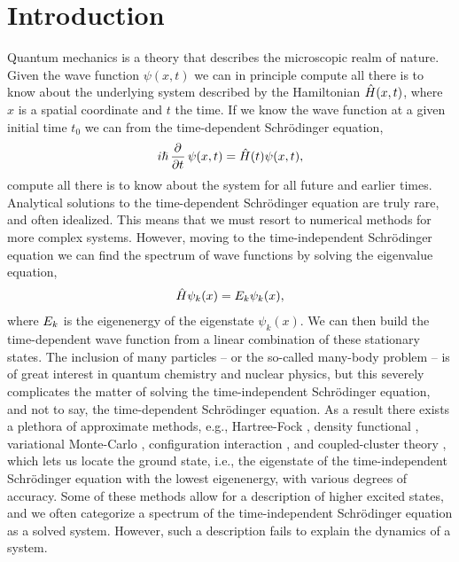 \chapter{Introduction}
    Quantum mechanics is a theory that describes the microscopic realm of
    nature.
    Given the wave function $\psi(x, t)$ we can in principle compute all there
    is to know about the underlying system described by the Hamiltonian
    $\hat{H}(x, t)$, where $x$ is a spatial coordinate and $t$ the time.
    If we know the wave function at a given initial time $t_0$ we can from the
    time-dependent Schrödinger equation,
    \begin{align}
        i\hslash\dpd{}{t}\psi(x, t) = \hamil(t)\psi(x, t),
    \end{align}
    compute all there is to know about the system for all future and earlier
    times.
    Analytical solutions to the time-dependent Schrödinger equation are truly
    rare, and often idealized.
    This means that we must resort to numerical methods for more complex
    systems.
    However, moving to the time-independent Schrödinger equation we can find the
    spectrum of wave functions by solving the eigenvalue equation,
    \begin{align}
        \hat{H}\psi_k(x) = E_k\psi_k(x),
    \end{align}
    where $E_k$ is the eigenenergy of the eigenstate $\psi_k(x)$.
    We can then build the time-dependent wave function from a linear combination
    of these stationary states.
    The inclusion of many particles -- or the so-called many-body problem -- is
    of great interest in quantum chemistry and nuclear physics, but this
    severely complicates the matter of solving the time-independent Schrödinger
    equation, and not to say, the time-dependent Schrödinger equation.
    As a result there exists a plethora of approximate methods, e.g.,
    Hartree-Fock \cite{hartree_1928, szabo1996modern}, density functional
    \cite{ullrich2011time}, variational Monte-Carlo \cite{hjorth2017advanced},
    configuration interaction \cite{helgaker-molecular}, and coupled-cluster
    theory \cite{coester1958421}, which lets us locate the ground state, i.e.,
    the eigenstate of the time-independent Schrödinger equation with the lowest
    eigenenergy, with various degrees of accuracy.
    Some of these methods allow for a description of higher excited states, and
    we often categorize a spectrum of the time-independent Schrödinger equation
    as a solved system.
    However, such a description fails to explain the dynamics of a system.

